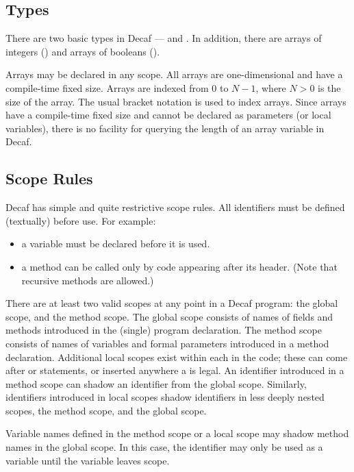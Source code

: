 \subsection*{Types}

There are two basic types in Decaf ---  and
.  In addition, there are arrays of integers () and arrays of booleans ().

Arrays may be declared in any scope.
All arrays are one-dimensional and have a compile-time fixed size.
Arrays are indexed from 0 to $N-1$, where $N > 0$ is the size of the
array.  The usual bracket notation is used to index arrays.  Since
arrays have a compile-time fixed size and cannot be declared as
parameters (or local variables), there is no facility for querying the
length of an array variable in Decaf.

\subsection*{Scope Rules}

Decaf has simple and quite restrictive scope rules.  All
identifiers must be defined (textually) before use.  For example:

 \begin{itemize}
  \item a variable must be declared before it is used.
  \item a method can be called only by code appearing after its header.
(Note that recursive methods are allowed.)
 \end{itemize}

There are at least two valid scopes at any point in a
Decaf program: the global scope, and the method
scope.  The global scope consists of names of fields and methods
introduced in the (single) program declaration.  The
method scope consists of names of variables and formal parameters
introduced in a method declaration.  Additional local scopes exist within
each  in the code; these can come after  or 
statements, or inserted anywhere a  is
legal.  An identifier introduced in a method scope can shadow an
identifier from the global scope.  Similarly, identifiers introduced
in local scopes shadow identifiers in less deeply nested scopes, the
method scope, and the global scope.

Variable names defined in the method scope or a local scope may
shadow method names in the global scope.  In this case, the
identifier may only be used as a variable until the variable leaves
scope.

